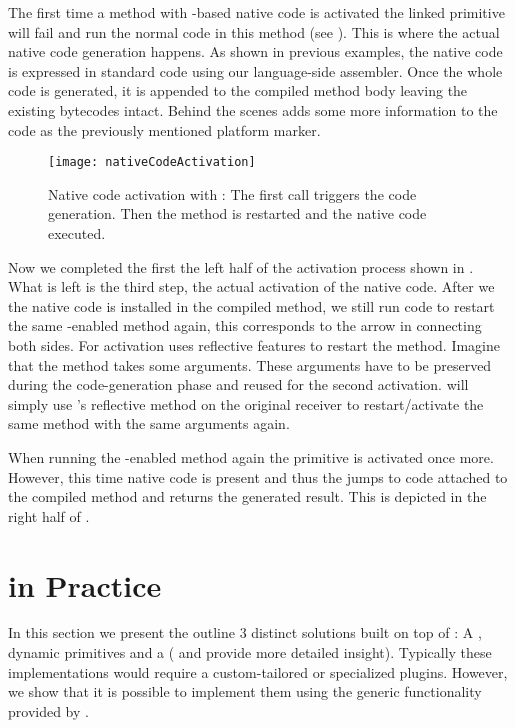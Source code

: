 \noindent The first time a method with \B-based native code is activated the linked \B primitive will fail and run the normal \PH code in this method (see ).
This is where the actual native code generation happens.
As shown in previous examples, the native code is expressed in standard \PH code using our language-side assembler.
Once the whole code is generated, it is appended to the compiled method body leaving the existing \PH bytecodes intact.
Behind the scenes \B adds some more information to the code as the previously mentioned platform marker. 

\begin{figure}[ht]
	\centering
	\texttt{[image: nativeCodeActivation]}
	\caption[\B Native Code Acivation]{Native code activation with \B: The first call triggers the code generation. Then the method is restarted and the native code executed.}
\end{figure}

\noindent Now we completed the first the left half of the activation process shown in .
What is left is the third step, the actual activation of the native code.
After we the native code is installed in the compiled method, we still run \PH code to restart the same \B-enabled method again, this corresponds to the arrow in  connecting both sides.
For activation \B uses reflective features to restart the method.
Imagine that the method takes some arguments.
These arguments have to be preserved during the code-generation phase and reused for the second activation.
\B will simply use \PH's reflective  method on the original receiver to restart/activate the same method with the same arguments again.

When running the \B-enabled method again the \B primitive is activated once more.
However, this time native code is present and thus the \B jumps to code attached to the compiled method and returns the generated result.
This is depicted in the right half of .

\section{\B in Practice}
In this section we present the outline 3 distinct solutions built on top of \B: A \FFI, dynamic primitives and a \JIT ( and  provide more detailed insight).
Typically these implementations would require a custom-tailored \VM or specialized plugins.
However, we show that it is possible to implement them using the generic functionality provided by \B.

